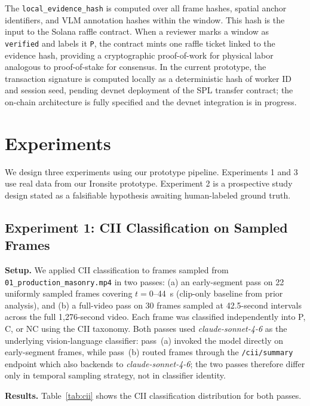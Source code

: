\documentclass[sigconf,nonacm]{acmart}
\begin{document}
The \texttt{local\_evidence\_hash} is computed over all frame hashes, spatial
anchor identifiers, and VLM annotation hashes within the window. This hash is
the input to the Solana raffle contract. When a reviewer marks a window as
\texttt{verified} and labels it \texttt{P}, the contract mints one raffle ticket
linked to the evidence hash, providing a cryptographic proof-of-work for
physical labor analogous to proof-of-stake for consensus. In the current
prototype, the transaction signature is computed locally as a deterministic hash
of worker ID and session seed, pending devnet deployment of the SPL transfer
contract; the on-chain architecture is fully specified and the devnet integration
is in progress.

\section{Experiments}

We design three experiments using our prototype pipeline. Experiments 1 and 3
use real data from our Ironsite prototype. Experiment 2 is a prospective study
design stated as a falsifiable hypothesis awaiting human-labeled ground truth.

\subsection{Experiment 1: CII Classification on Sampled Frames}
\label{sec:exp1}

\textbf{Setup.} We applied CII classification to frames sampled from
\texttt{01\_production\_masonry.mp4} in two passes: (a) an early-segment pass
on 22 uniformly sampled frames covering $t = 0$--44~s (clip-only baseline from
prior analysis), and (b) a full-video pass on 30 frames sampled at 42.5-second
intervals across the full 1,276-second video. Each frame was classified
independently into P, C, or NC using the CII taxonomy.
Both passes used \textit{claude-sonnet-4-6} as the underlying vision-language
classifier: pass~(a) invoked the model directly on early-segment frames, while
pass~(b) routed frames through the \texttt{/cii/summary} endpoint which also
backends to \textit{claude-sonnet-4-6}; the two passes therefore differ only in
temporal sampling strategy, not in classifier identity.

\textbf{Results.} Table~\ref{tab:cii} shows the CII classification distribution
for both passes.
\end{document}
